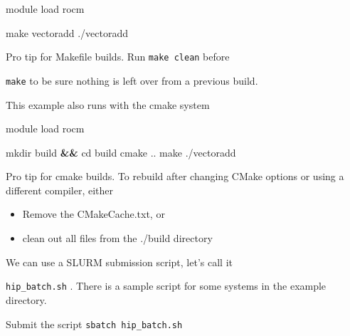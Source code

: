 \documentclass[
]{article}
\providecommand{\tightlist}{%
  \setlength{\itemsep}{0pt}\setlength{\parskip}{0pt}}
\let\oldtexttt\texttt
\renewcommand{\texttt}[1]{
  \colorbox{Light}{\oldtexttt{#1}}
}
\newenvironment{Shaded}{}{}
\newcommand{\BuiltInTok}[1]{#1}
\newcommand{\CommentTok}[1]{\textcolor[rgb]{0.38,0.63,0.69}{\textit{#1}}}
\newcommand{\ExtensionTok}[1]{#1}
\newcommand{\FunctionTok}[1]{\textcolor[rgb]{0.02,0.16,0.49}{#1}}
\newcommand{\KeywordTok}[1]{\textcolor[rgb]{0.00,0.44,0.13}{\textbf{#1}}}
\newcommand{\NormalTok}[1]{#1}
\newcommand{\VariableTok}[1]{\textcolor[rgb]{0.10,0.09,0.49}{#1}}
\providecommand{\tightlist}{%
  \setlength{\itemsep}{0pt}\setlength{\parskip}{0pt}}
\begin{document}
\begin{Shaded}
\begin{Highlighting}[]
\ExtensionTok{module}\NormalTok{ load rocm}

\FunctionTok{make}\NormalTok{ vectoradd}
\ExtensionTok{./vectoradd}
\end{Highlighting}
\end{Shaded}

Pro tip for Makefile builds. Run \texttt{make\ clean} before
\texttt{make} to be sure nothing is left over from a previous build.

This example also runs with the cmake system

\begin{Shaded}
\begin{Highlighting}[]
\ExtensionTok{module}\NormalTok{ load rocm}

\FunctionTok{mkdir}\NormalTok{ build }\KeywordTok{\&\&} \BuiltInTok{cd}\NormalTok{ build}
\FunctionTok{cmake}\NormalTok{ ..}
\FunctionTok{make}
\ExtensionTok{./vectoradd}
\end{Highlighting}
\end{Shaded}

Pro tip for cmake builds. To rebuild after changing CMake options or
using a different compiler, either

\begin{itemize}
\tightlist
\item
  Remove the CMakeCache.txt, or
\item
  clean out all files from the ./build directory
\end{itemize}

We can use a SLURM submission script, let's call it
\texttt{hip\_batch.sh}. There is a sample script for some systems in the
example directory.

\begin{Shaded}
\end{Shaded}

Submit the script \texttt{sbatch\ hip\_batch.sh}
\end{document}
